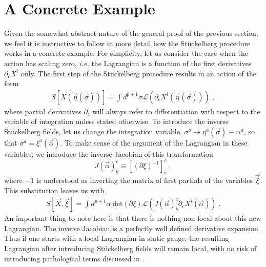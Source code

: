 \documentclass[%
 reprint,
 amsmath,amssymb,
 aps,
]{revtex4-1}
\begin{document}
\section{A Concrete Example}
Given the somewhat abstract nature of the general proof of the previous section, we feel it is instructive to follow in more detail
 how the St\"uckelberg procedure works in a concrete example. For simplicity, let us consider the case when the action has scaling zero,
 {\it i.e.} the Lagrangian is a function of the first derivatives $\partial_c X^i$ only. The first step of the St\"uckelberg procedure
 results in an action of the form
\begin{eqnarray}
    S[\vec{X}(\vec{\eta}(\vec{\sigma}))] = \int d^{p+1} \sigma \mathcal{L}
     (\partial_c X^i (\vec{\eta}(\vec{\sigma}))) \; , \nonumber
\end{eqnarray}
where partial derivatives $\partial_c$ will always refer to differentiation with respect to the variable of integration
unless stated otherwise.  To introduce the inverse St\"uckelberg fields, let us change the integration variable,
 $\sigma^a \rightarrow \eta^a(\vec{\sigma}) \equiv \alpha^a$, so that
$\sigma^a = \xi^a(\vec{\alpha})$. To make sense of the argument of the Lagrangian in these variables, we introduce the inverse
Jacobian of this transformation
\begin{equation}
    J(\vec{\alpha})^c_b \equiv [(\partial \xi)^{-1}]^c_b \; ,
\end{equation}
where $-1$ is understood as inverting the matrix of first partials of the variables $\vec{\xi}$.
This substitution leaves us with
\begin{eqnarray}
    S[\vec{X},\vec{\xi}]  = \int d^{p+1} \alpha\;
   \mathrm{det}\left({\partial \xi} \right)
   \mathcal{L}( J(\vec{\alpha})^c_b \partial_c X^i(\vec{\alpha}) )
     \; . \nonumber
\end{eqnarray}
An important thing to note here is that there is nothing non-local about this new Lagrangian.  The inverse
Jacobian is a perfectly well defined derivative expansion.  Thus if one starts with a local Lagrangian in static gauge,
the resulting Lagrangian after introducing St\"uckelberg fields will remain local, with no risk of introducing pathological
terms discussed in \cite{Aharony:2011gb}.
\end{document}
